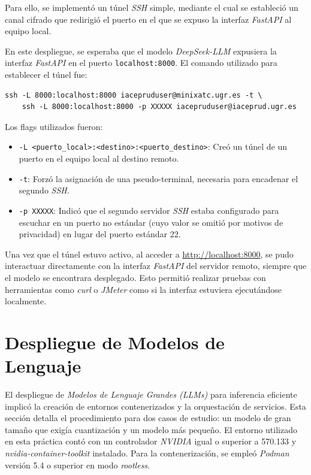 Para ello, se implementó un túnel \textit{SSH} simple, mediante el cual se estableció un canal cifrado que redirigió el puerto en el que se expuso la interfaz \textit{FastAPI} al equipo local.

En este despliegue, se esperaba que el modelo \textit{DeepSeek-LLM} expusiera la interfaz \textit{FastAPI} en el puerto \texttt{localhost:8000}. El comando utilizado para establecer el túnel fue:

\newpage
\begin{verbatim}
ssh -L 8000:localhost:8000 iacepruduser@minixatc.ugr.es -t \
    ssh -L 8000:localhost:8000 -p XXXXX iacepruduser@iaceprud.ugr.es
\end{verbatim}

Los flags utilizados fueron:
\begin{itemize}
    \item \texttt{-L <puerto\_local>:<destino>:<puerto\_destino>}: Creó un túnel de un puerto en el equipo local al destino remoto.
    \item \texttt{-t}: Forzó la asignación de una pseudo-terminal, necesaria para encadenar el segundo \textit{SSH}.
    \item \texttt{-p XXXXX}: Indicó que el segundo servidor \textit{SSH} estaba configurado para escuchar en un puerto no estándar (cuyo valor se omitió por motivos de privacidad) en lugar del puerto estándar 22.
\end{itemize}
Una vez que el túnel estuvo activo, al acceder a \url{http://localhost:8000}, se pudo interactuar directamente con la interfaz \textit{FastAPI} del servidor remoto, siempre que el modelo se encontrara desplegado. Esto permitió realizar pruebas con herramientas como \textit{curl} o \textit{JMeter} como si la interfaz estuviera ejecutándose localmente.

\section{Despliegue de Modelos de Lenguaje}
El despliegue de \textit{Modelos de Lenguaje Grandes (LLMs)} para inferencia eficiente implicó la creación de entornos contenerizados y la orquestación de servicios. Esta sección detalla el procedimiento para dos casos de estudio: un modelo de gran tamaño que exigía cuantización y un modelo más pequeño. El entorno utilizado en esta práctica contó con un controlador \textit{NVIDIA} igual o superior a 570.133 y \textit{nvidia-container-toolkit} instalado. Para la contenerización, se empleó \textit{Podman} versión 5.4 o superior en modo \textit{rootless}.

